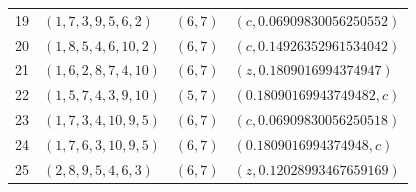 \begin{longtable}{rll>{\raggedright\arraybackslash}p{}}
19 & $(1,7,3,9,5,6,2)$ & $(6,7)$ & $(c,0.06909830056250552)$ \\
20 & $(1,8,5,4,6,10,2)$ & $(6,7)$ & $(c,0.14926352961534042)$ \\
21 & $(1,6,2,8,7,4,10)$ & $(6,7)$ & $(z,0.1809016994374947)$ \\
22 & $(1,5,7,4,3,9,10)$ & $(5,7)$ & $(0.18090169943749482,c)$ \\
23 & $(1,7,3,4,10,9,5)$ & $(6,7)$ & $(c,0.06909830056250518)$ \\
24 & $(1,7,6,3,10,9,5)$ & $(6,7)$ & $(0.1809016994374948,c)$ \\
25 & $(2,8,9,5,4,6,3)$ & $(6,7)$ & $(z,0.12028993467659169)$ \\
\end{longtable}
